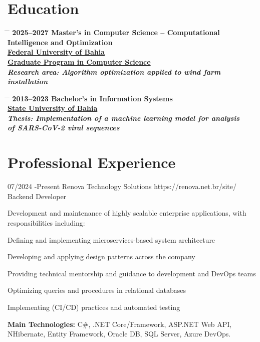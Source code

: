 \documentclass{article}
\begin{document}
\section*{Education}

\begin{tabbing}
  \hspace{2cm} \= \hspace{4cm} \= \kill
  \bf{2025--2027} \> Master’s in Computer Science – Computational Intelligence and Optimization \\
  \href{https://www.ufba.br/}{Federal University of Bahia} \\
  \href{https://pgcomp.ufba.br/}{Graduate Program in Computer Science} \\
  \> \textit{Research area: Algorithm optimization applied to wind farm installation} \\
\end{tabbing}

\begin{tabbing}
  \hspace{2cm} \= \hspace{4cm} \= \kill
  \bf{2013--2023} \> Bachelor’s in Information Systems \\
  \href{https://portal.uneb.br/}{State University of Bahia} \\
  \> \textit{Thesis: Implementation of a machine learning model for analysis} \\
  \> \textit{of SARS-CoV-2 viral sequences} \\
\end{tabbing}

\section*{Professional Experience}

\begin{job}
{07/2024 -}{Present}
{Renova Technology Solutions}
{https://renova.net.br/site/}
{Backend Developer}%
{Development and maintenance of highly scalable enterprise applications, with responsibilities including:
  \begin{itemize-noindent}
  \item Defining and implementing microservices-based system architecture
  \item Developing and applying design patterns across the company
  \item Providing technical mentorship and guidance to development and DevOps teams
  \item Optimizing queries and procedures in relational databases
  \item Implementing (CI/CD) practices and automated testing
  \end{itemize-noindent}
  \rule{0mm}{5mm}\textbf{Main Technologies:} C\#, {.NET Core}/Framework, ASP.NET Web API, NHibernate, Entity Framework, Oracle DB, SQL Server, Azure DevOps.}
\end{job}
\end{document}
